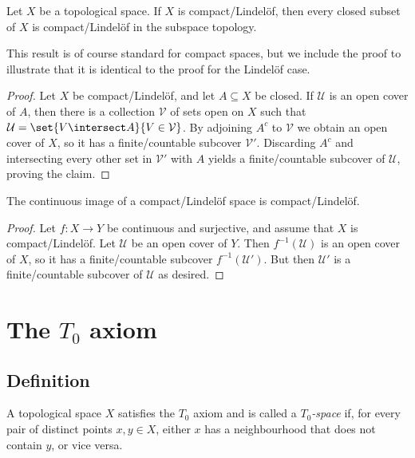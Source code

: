 \documentclass[article, a4paper, 11pt, oneside]{memoir}
\numberwithin{equation}{chapter}
\newcommand{\preim}{^{-1}}
\newcommand{\calU}{\mathcal{U}}
\newcommand{\calV}{\mathcal{V}}
\begin{document}
\begin{proposition}
    \label{thm:compact-Lindelof-closed-subset}
    Let $X$ be a topological space. If $X$ is compact/Lindelöf, then every closed subset of $X$ is compact/Lindelöf in the subspace topology.
\end{proposition}
%
This result is of course standard for compact spaces, but we include the proof to illustrate that it is identical to the proof for the Lindelöf case.

\begin{proof}
    Let $X$ be compact/Lindelöf, and let $A \subseteq X$ be closed. If $\calU$ is an open cover of $A$, then there is a collection $\calV$ of sets open on $X$ such that $\calU = \set{V \intersect A}{V \in \calV}$. By adjoining $A^c$ to $\calV$ we obtain an open cover of $X$, so it has a finite/countable subcover $\calV'$. Discarding $A^c$ and intersecting every other set in $\calV'$ with $A$ yields a finite/countable subcover of $\calU$, proving the claim.
\end{proof}


\begin{proposition}
    The continuous image of a compact/Lindelöf space is compact/Lindelöf.
\end{proposition}

\begin{proof}
    Let $f \colon X \to Y$ be continuous and surjective, and assume that $X$ is compact/Lindelöf. Let $\calU$ be an open cover of $Y$. Then $f\preim(\calU)$ is an open cover of $X$, so it has a finite/countable subcover $f\preim(\calU')$. But then $\calU'$ is a finite/countable subcover of $\calU$ as desired.
\end{proof}



\chapter[The T0 axiom][The $T_0$ axiom]{The $T_0$ axiom}

\section{Definition}

\begin{definition}
    A topological space $X$ satisfies the $T_0$ axiom and is called a \emph{$T_0$-space} if, for every pair of distinct points $x,y \in X$, either $x$ has a neighbourhood that does not contain $y$, or vice versa.
\end{definition}
\end{document}
